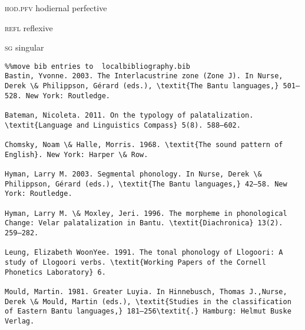 \documentclass[output=paper]{langsci/langscibook}
\begin{document}
\textsc{hod.pfv}  hodiernal perfective

\textsc{refl}    reflexive

\textsc{sg}    singular
  

\begin{verbatim}%%move bib entries to  localbibliography.bib
Bastin, Yvonne. 2003. The Interlacustrine zone (Zone J). In Nurse, Derek \& Philippson, Gérard (eds.), \textit{The Bantu languages,} 501–528. New York: Routledge. 

Bateman, Nicoleta. 2011. On the typology of palatalization. \textit{Language and Linguistics Compass} 5(8). 588–602.

Chomsky, Noam \& Halle, Morris. 1968. \textit{The sound pattern of English}. New York: Harper \& Row. 

Hyman, Larry M. 2003. Segmental phonology. In Nurse, Derek \& Philippson, Gérard (eds.), \textit{The Bantu languages,} 42–58. New York: Routledge.

Hyman, Larry M. \& Moxley, Jeri. 1996. The morpheme in phonological Change: Velar palatalization in Bantu. \textit{Diachronica} 13(2). 259–282. 

Leung, Elizabeth WoonYee. 1991. The tonal phonology of Llogoori: A study of Llogoori verbs. \textit{Working Papers of the Cornell Phonetics Laboratory} 6. 

Mould, Martin. 1981. Greater Luyia. In Hinnebusch, Thomas J.,Nurse, Derek \& Mould, Martin (eds.), \textit{Studies in the classification of Eastern Bantu languages,} 181–256\textit{.} Hamburg: Helmut Buske Verlag. 


\end{verbatim}
 

\printbibliography[heading=subbibliography,notkeyword=this]
\end{document}
